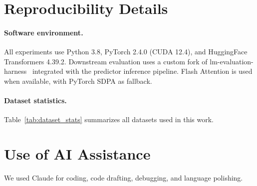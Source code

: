 \section{Reproducibility Details}
\label{app:reproducibility}

\paragraph{Software environment.}
All experiments use Python 3.8, PyTorch 2.4.0 (CUDA 12.4), and HuggingFace Transformers 4.39.2.
Downstream evaluation uses a custom fork of lm-evaluation-harness~\cite{eval-harness} integrated with the predictor inference pipeline.
Flash Attention is used when available, with PyTorch SDPA as fallback.

\paragraph{Dataset statistics.}
Table~\ref{tab:dataset_stats} summarizes all datasets used in this work.

\begin{table}[h]
\centering
\caption{Dataset statistics. Predictor training uses WikiText-103; perplexity evaluation uses WikiText-2 and C4 validation splits; downstream evaluation uses standard benchmarks with their default splits.}
\label{tab:dataset_stats}
\end{table}

\section{Use of AI Assistance}

We used Claude for coding, code drafting, debugging, and language polishing.
